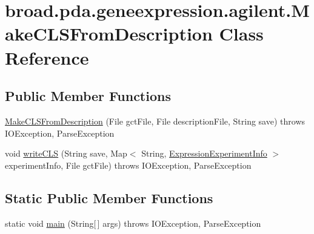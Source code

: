 \hypertarget{classbroad_1_1pda_1_1geneexpression_1_1agilent_1_1_make_c_l_s_from_description}{\section{broad.\+pda.\+geneexpression.\+agilent.\+Make\+C\+L\+S\+From\+Description Class Reference}
\label{classbroad_1_1pda_1_1geneexpression_1_1agilent_1_1_make_c_l_s_from_description}
}
\subsection*{Public Member Functions}
\begin{DoxyCompactItemize}
\item 
\hyperlink{classbroad_1_1pda_1_1geneexpression_1_1agilent_1_1_make_c_l_s_from_description_abb7487e724fdeb8359d2c3460e21e7b3}{Make\+C\+L\+S\+From\+Description} (File gct\+File, File description\+File, String save)  throws I\+O\+Exception, Parse\+Exception 
\item 
void \hyperlink{classbroad_1_1pda_1_1geneexpression_1_1agilent_1_1_make_c_l_s_from_description_aa77468aac139f8a1e0a19ea7ce5f7ecc}{write\+C\+L\+S} (String save, Map$<$ String, \hyperlink{classbroad_1_1pda_1_1geneexpression_1_1_expression_experiment_info}{Expression\+Experiment\+Info} $>$ experiment\+Info, File gct\+File)  throws I\+O\+Exception, Parse\+Exception
\end{DoxyCompactItemize}
\subsection*{Static Public Member Functions}
\begin{DoxyCompactItemize}
\item 
static void \hyperlink{classbroad_1_1pda_1_1geneexpression_1_1agilent_1_1_make_c_l_s_from_description_a15f144038a7673393c02908591a2f441}{main} (String\mbox{[}$\,$\mbox{]} args)  throws I\+O\+Exception, Parse\+Exception
\end{DoxyCompactItemize}


